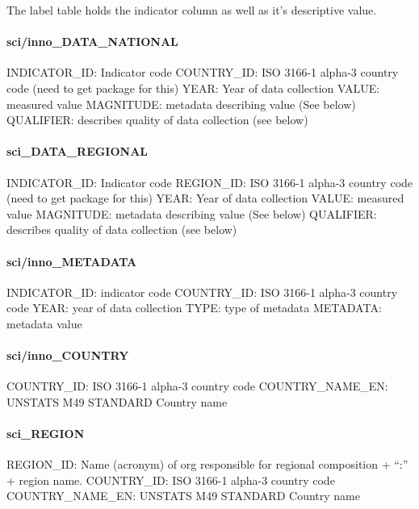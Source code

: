 \documentclass[
]{article}
\begin{document}
The label table holds the indicator column as well as it's descriptive
value.

\hypertarget{sciinno_data_national}{%
\paragraph{sci/inno\_DATA\_NATIONAL}\label{sciinno_data_national}}

INDICATOR\_ID: Indicator code COUNTRY\_ID: ISO 3166-1 alpha-3 country
code (need to get package for this) YEAR: Year of data collection VALUE:
measured value MAGNITUDE: metadata describing value (See below)
QUALIFIER: describes quality of data collection (see below)

\hypertarget{sci_data_regional}{%
\paragraph{sci\_DATA\_REGIONAL}\label{sci_data_regional}}

INDICATOR\_ID: Indicator code REGION\_ID: ISO 3166-1 alpha-3 country
code (need to get package for this) YEAR: Year of data collection VALUE:
measured value MAGNITUDE: metadata describing value (See below)
QUALIFIER: describes quality of data collection (see below)

\hypertarget{sciinno_metadata}{%
\paragraph{sci/inno\_METADATA}\label{sciinno_metadata}}

INDICATOR\_ID: indicator code COUNTRY\_ID: ISO 3166-1 alpha-3 country
code YEAR: year of data collection TYPE: type of metadata METADATA:
metadata value

\hypertarget{sciinno_country}{%
\paragraph{sci/inno\_COUNTRY}\label{sciinno_country}}

COUNTRY\_ID: ISO 3166-1 alpha-3 country code COUNTRY\_NAME\_EN: UNSTATS
M49 STANDARD Country name

\hypertarget{sci_region}{%
\paragraph{sci\_REGION}\label{sci_region}}

REGION\_ID: Name (acronym) of org responsible for regional composition +
``:'' + region name. COUNTRY\_ID: ISO 3166-1 alpha-3 country code
COUNTRY\_NAME\_EN: UNSTATS M49 STANDARD Country name
\end{document}
